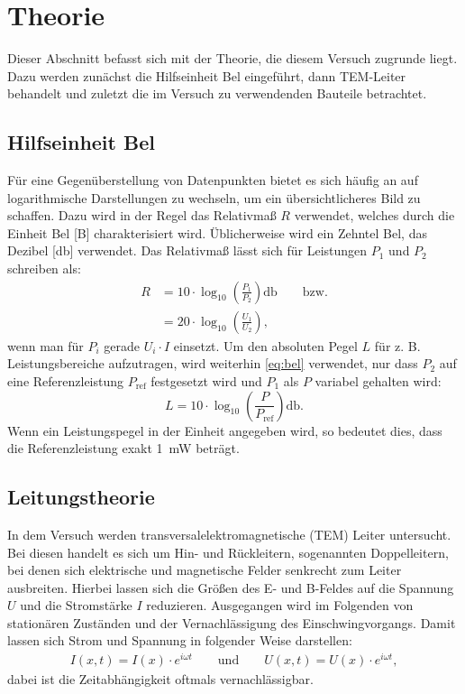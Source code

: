 \section{Theorie}
	
	Dieser Abschnitt befasst sich mit der Theorie, die diesem Versuch zugrunde liegt.
	Dazu werden zunächst die Hilfseinheit Bel eingeführt, dann TEM-Leiter behandelt und zuletzt die im Versuch zu verwendenden Bauteile betrachtet.  
	
\subsection{Hilfseinheit Bel}

	Für eine Gegenüberstellung von Datenpunkten bietet es sich häufig an auf logarithmische Darstellungen zu wechseln, um ein übersichtlicheres Bild zu schaffen.
	Dazu wird in der Regel das Relativmaß $R$ verwendet, welches durch die Einheit Bel [\si{\bel}] charakterisiert wird.
	Üblicherweise wird ein Zehntel Bel, das Dezibel [\si{\decibel}] verwendet.
	Das Relativmaß lässt sich für Leistungen $P_1$ und $P_2$ schreiben als:
	\begin{align}
		R &= 10 \cdot \log_{10}\left(\frac{P_1}{P_2}\right)\si{\decibel} \label{eq:bel} \quad\quad \text{bzw.} \\
		&= 20 \cdot \log_{10}\left(\frac{U_1}{U_2}\right) \label{eq:bel2},
	\end{align}
	wenn man für $P_i$ gerade $U_i \cdot I$ einsetzt.
	Um den absoluten Pegel $L$ für z. B. Leistungsbereiche aufzutragen, wird weiterhin \cref{eq:bel} verwendet, nur dass $P_2$ auf eine Referenzleistung $P_\text{ref}$ festgesetzt wird und $P_1$ als $P$ variabel gehalten wird:
	\begin{equation}
		L = 10 \cdot \log_{10}\left(\frac{P}{P_\text{ref}}\right)\si{\decibel}.
		\label{eq:leistungspegel}
	\end{equation}
	Wenn ein Leistungspegel in der Einheit \si{\decibelmilliwatt} angegeben wird, so bedeutet dies, dass die Referenzleistung exakt \SI{1}{\milli\watt} beträgt.

\subsection{Leitungstheorie}
	
	In dem Versuch werden transversalelektromagnetische (TEM) Leiter untersucht.
	Bei diesen handelt es sich um Hin- und Rückleitern, sogenannten Doppelleitern, bei denen sich elektrische und magnetische Felder senkrecht zum Leiter ausbreiten.
	Hierbei lassen sich die Größen des E- und B-Feldes auf die Spannung $U$ und die Stromstärke $I$ reduzieren.
	Ausgegangen wird im Folgenden von stationären Zuständen und der Vernachlässigung des Einschwingvorgangs.
	Damit lassen sich Strom und Spannung in folgender Weise darstellen:
	\begin{align}
		I(x,t) = I(x)\cdot e^{i\omega t} \quad\quad \text{und} \quad\quad U(x,t) = U(x)\cdot e^{i\omega t},
	\end{align}
	dabei ist die Zeitabhängigkeit oftmals vernachlässigbar.
	
